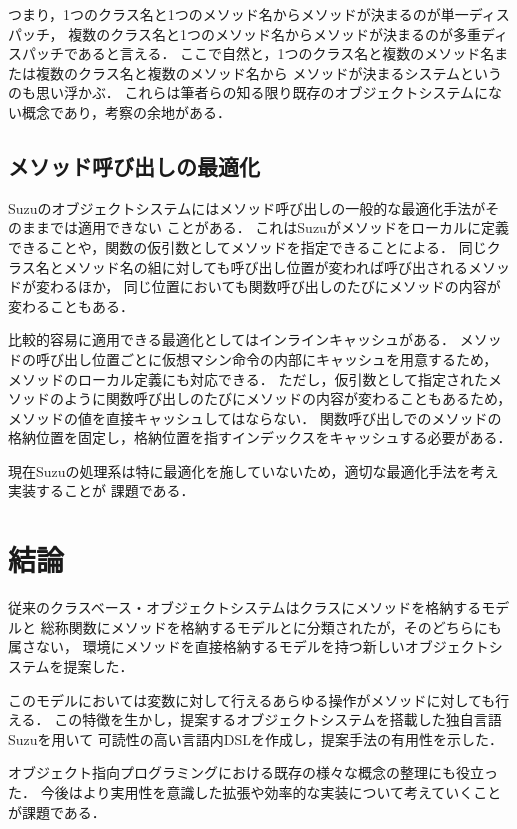 \documentclass{ipsjprosym}
\begin{document}
つまり，1つのクラス名と1つのメソッド名からメソッドが決まるのが単一ディスパッチ，
複数のクラス名と1つのメソッド名からメソッドが決まるのが多重ディスパッチであると言える．
ここで自然と，1つのクラス名と複数のメソッド名または複数のクラス名と複数のメソッド名から
メソッドが決まるシステムというのも思い浮かぶ．
これらは筆者らの知る限り既存のオブジェクトシステムにない概念であり，考察の余地がある．

\subsection{メソッド呼び出しの最適化}

Suzuのオブジェクトシステムにはメソッド呼び出しの一般的な最適化手法がそのままでは適用できない
ことがある．
これはSuzuがメソッドをローカルに定義できることや，関数の仮引数としてメソッドを指定できることによる．
同じクラス名とメソッド名の組に対しても呼び出し位置が変われば呼び出されるメソッドが変わるほか，
同じ位置においても関数呼び出しのたびにメソッドの内容が変わることもある．

比較的容易に適用できる最適化としてはインラインキャッシュ\cite{Onodera:1997-04-15}がある．
メソッドの呼び出し位置ごとに仮想マシン命令の内部にキャッシュを用意するため，
メソッドのローカル定義にも対応できる．
ただし，仮引数として指定されたメソッドのように関数呼び出しのたびにメソッドの内容が変わることもあるため，
メソッドの値を直接キャッシュしてはならない．
関数呼び出しでのメソッドの格納位置を固定し，格納位置を指すインデックスをキャッシュする必要がある．

現在Suzuの処理系は特に最適化を施していないため，適切な最適化手法を考え実装することが
課題である．

\section{結論}

従来のクラスベース・オブジェクトシステムはクラスにメソッドを格納するモデルと
総称関数にメソッドを格納するモデルとに分類されたが，そのどちらにも属さない，
環境にメソッドを直接格納するモデルを持つ新しいオブジェクトシステムを提案した．

このモデルにおいては変数に対して行えるあらゆる操作がメソッドに対しても行える．
この特徴を生かし，提案するオブジェクトシステムを搭載した独自言語Suzuを用いて
可読性の高い言語内DSLを作成し，提案手法の有用性を示した．

オブジェクト指向プログラミングにおける既存の様々な概念の整理にも役立った．
今後はより実用性を意識した拡張や効率的な実装について考えていくことが課題である．
\end{document}
